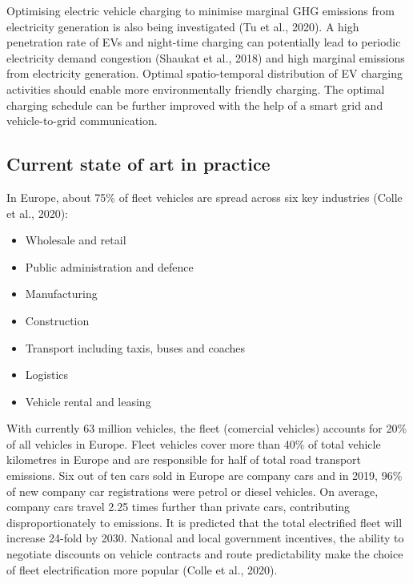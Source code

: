 \documentclass[
]{book}
\providecommand{\tightlist}{%
  \setlength{\itemsep}{0pt}\setlength{\parskip}{0pt}}
\begin{document}
Optimising electric vehicle charging to minimise marginal GHG emissions from electricity generation is also being investigated (Tu et al., 2020). A high penetration rate of EVs and night-time charging can potentially lead to periodic electricity demand congestion (Shaukat et al., 2018) and high marginal emissions from electricity generation. Optimal spatio-temporal distribution of EV charging activities should enable more environmentally friendly charging. The optimal charging schedule can be further improved with the help of a smart grid and vehicle-to-grid communication.

\hypertarget{current-state-of-art-in-practice-26}{%
\subsection*{Current state of art in practice}\label{current-state-of-art-in-practice-26}}

In Europe, about 75\% of fleet vehicles are spread across six key industries (Colle et al., 2020):

\begin{itemize}
\tightlist
\item
  Wholesale and retail
\item
  Public administration and defence
\item
  Manufacturing
\item
  Construction
\item
  Transport including taxis, buses and coaches
\item
  Logistics
\item
  Vehicle rental and leasing
\end{itemize}

With currently 63 million vehicles, the fleet (comercial vehicles) accounts for 20\% of all vehicles in Europe. Fleet vehicles cover more than 40\% of total vehicle kilometres in Europe and are responsible for half of total road transport emissions. Six out of ten cars sold in Europe are company cars and in 2019, 96\% of new company car registrations were petrol or diesel vehicles. On average, company cars travel 2.25 times further than private cars, contributing disproportionately to emissions. It is predicted that the total electrified fleet will increase 24-fold by 2030. National and local government incentives, the ability to negotiate discounts on vehicle contracts and route predictability make the choice of fleet electrification more popular (Colle et al., 2020).
\end{document}
